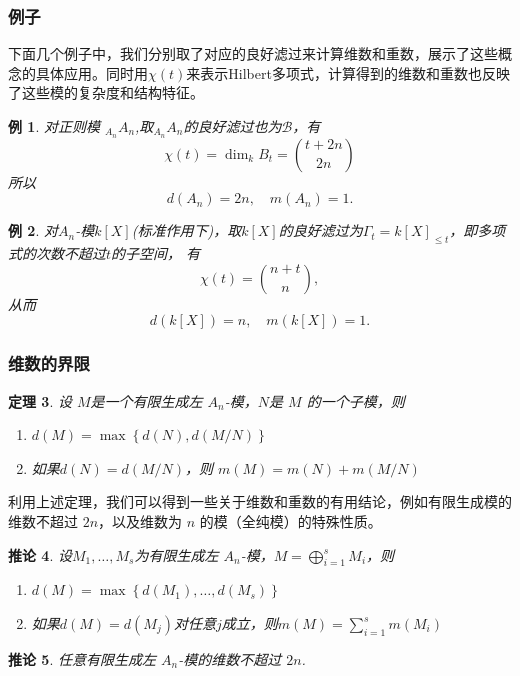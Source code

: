 \documentclass[11pt]{article}
\theoremstyle{plain}
\newtheorem{theorem}{定理}[section]
\newtheorem{corollary}[theorem]{推论}
\newtheorem{example}[theorem]{例}
\theoremstyle{definition}
\theoremstyle{remark}
\begin{document}
\subsubsection{例子}
下面几个例子中，我们分别取了对应的良好滤过来计算维数和重数，展示了这些概念的具体应用。同时用$\chi(t)$来表示Hilbert多项式，计算得到的维数和重数也反映了这些模的复杂度和结构特征。
\begin{example}
    对正则模 ${}_{A_n}A_n$,取${}_{A_n}A_n$的良好滤过也为$\mathcal{B}$，有
    \begin{equation*}
        \chi(t)
        =\dim_k B_t
        =\binom{t+2n}{2n}
    \end{equation*}
    所以
    \begin{equation*}
        d(A_n)=2n,
        \quad
        m(A_n)=1.
    \end{equation*}
\end{example}

\begin{example}
    对$A_n$-模$k[X]$(标准作用下)，取$k[X]$的良好滤过为$\Gamma_t=k[X]_{\le t}$，即多项式的次数不超过$t$的子空间，
    有
    \begin{equation*}
        \chi(t)=\binom{n+t}{n},
    \end{equation*}
    从而
    \begin{equation*}
        d(k[X])=n,
        \quad
        m(k[X])=1.
    \end{equation*}
\end{example}

\subsubsection{维数的界限}
\begin{theorem}
    \label{thm:Dimension}
    设 $M$是一个有限生成左 $A_n$-模，$N$是 $M$ 的一个子模，则
    \begin{enumerate}
        \item
              $ d(M)=\max\left\{d(N),d(M/N)\right\}$
        \item
              如果$d(N)=d(M/N)$，则 $m(M)=m(N)+m(M/N)$
    \end{enumerate}
\end{theorem}
利用上述定理，我们可以得到一些关于维数和重数的有用结论，例如有限生成模的维数不超过 $2n$，以及维数为 $n$ 的模（全纯模）的特殊性质。
\begin{corollary}
    设$M_1,\dots,M_s$为有限生成左 $A_n$-模，$M=\bigoplus_{i=1}^s M_i$，则
    \begin{enumerate}
        \item $d(M)=\max\left\{d(M_1),\dots,d(M_s)\right\}$
        \item 如果$d(M)=d(M_j)$对任意$j$成立，则$m(M)=\sum_{i=1}^s m(M_i)$
    \end{enumerate}
\end{corollary}
\begin{corollary}
    任意有限生成左 $A_n$-模的维数不超过 $2n$.
\end{corollary}
\end{document}
